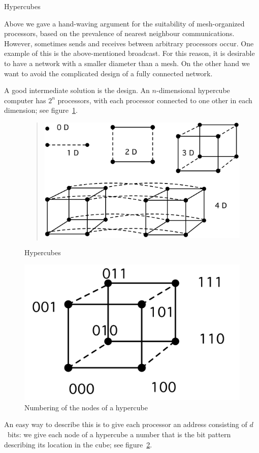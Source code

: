 {Hypercubes}
\label{sec:hypercube}

Above we gave a hand-waving argument for the suitability of
mesh-organized processors, based on the prevalence of nearest
neighbour communications. However, sometimes sends and receives
between arbitrary processors occur. One example of this is the
above-mentioned broadcast. For this reason, it is desirable to have a
network with a smaller diameter than a mesh. On the other hand we want
to avoid the complicated design of a fully connected network.

A good intermediate solution is the  design. An
$n$-dimensional hypercube computer has $2^n$ processors, with each
processor connected to one other in each dimension; see
figure~\ref{fig:hypercube}. 

\begin{figure}[ht]
  \begin{quote}
  \includegraphics[scale=.12]{graphics-public/hypercubes}
  \end{quote}
  \caption{Hypercubes}
  \label{fig:hypercube}
\end{figure}

\begin{figure}[ht]
  \centering
  \includegraphics[scale=.1]{graphics-public/hypercubenumber}
  \caption{Numbering of the nodes of a hypercube}
  \label{fig:cubenumber}
\end{figure}
An easy way to describe this is to give each processor an address
consisting of $d$~bits: we give each node of a hypercube a number that
is the bit pattern describing its location in the cube; see
figure~\ref{fig:cubenumber}.


